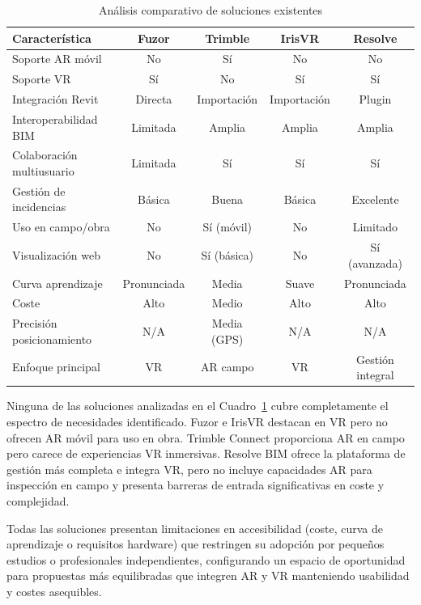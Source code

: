 \begin{table}[!htb]
\centering
\caption{Análisis comparativo de soluciones existentes}
\label{tab:comparativa-soluciones}
\small
\begin{tabular}{p{4cm}cccc}
\toprule
\textbf{Característica} & \textbf{Fuzor} & \textbf{Trimble} & \textbf{IrisVR} & \textbf{Resolve} \\
\midrule
Soporte AR móvil & No & Sí & No & No \\
\addlinespace
Soporte VR & Sí & No & Sí & Sí \\
\addlinespace
Integración Revit & Directa & Importación & Importación & Plugin \\
\addlinespace
Interoperabilidad BIM & Limitada & Amplia & Amplia & Amplia \\
\addlinespace
Colaboración multiusuario & Limitada & Sí & Sí & Sí \\
\addlinespace
Gestión de incidencias & Básica & Buena & Básica & Excelente \\
\addlinespace
Uso en campo/obra & No & Sí (móvil) & No & Limitado \\
\addlinespace
Visualización web & No & Sí (básica) & No & Sí (avanzada) \\
\addlinespace
Curva aprendizaje & Pronunciada & Media & Suave & Pronunciada \\
\addlinespace
Coste & Alto & Medio & Alto & Alto \\
\addlinespace
Precisión posicionamiento & N/A & Media (GPS) & N/A & N/A \\
\addlinespace
Enfoque principal & VR & AR campo & VR & Gestión integral \\
\bottomrule
\end{tabular}
\end{table}


Ninguna de las soluciones analizadas en el Cuadro~\ref{tab:comparativa-soluciones} cubre completamente el espectro de necesidades identificado. Fuzor e IrisVR destacan en VR pero no ofrecen AR móvil para uso en obra. Trimble Connect proporciona AR en campo pero carece de experiencias VR inmersivas. Resolve BIM ofrece la plataforma de gestión más completa e integra VR, pero no incluye capacidades AR para inspección en campo y presenta barreras de entrada significativas en coste y complejidad.

Todas las soluciones presentan limitaciones en accesibilidad (coste, curva de aprendizaje o requisitos hardware) que restringen su adopción por pequeños estudios o profesionales independientes, configurando un espacio de oportunidad para propuestas más equilibradas que integren AR y VR manteniendo usabilidad y costes asequibles.

